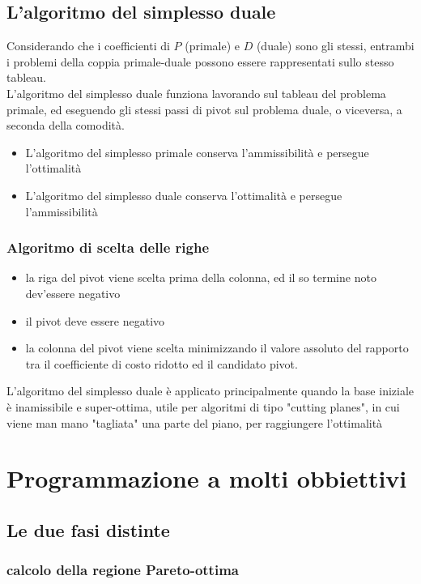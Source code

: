 \documentclass[11pt, oneside]{article}   	%
\begin{document}
\subsection{L'algoritmo del simplesso duale}
Considerando che i coefficienti di $P$ (primale) e $D$ (duale) sono gli stessi, entrambi i problemi della coppia primale-duale possono essere rappresentati sullo stesso tableau.\\

L'algoritmo del simplesso duale funziona lavorando sul tableau del problema primale, ed eseguendo gli stessi passi di pivot sul problema duale, o viceversa, a seconda della comodità.
\begin{itemize}
\item L'algoritmo del simplesso primale conserva l'ammissibilità e persegue l'ottimalità
\item L'algoritmo del simplesso duale conserva l'ottimalità e persegue l'ammissibilità
\end{itemize}
\subsubsection{Algoritmo di scelta delle righe}
\begin{itemize}
\item la riga del pivot viene scelta prima della colonna, ed il so termine noto dev'essere negativo
\item il pivot deve essere negativo
\item la colonna del pivot viene scelta minimizzando il valore assoluto del rapporto tra il coefficiente di costo ridotto ed il candidato pivot.
\end{itemize}
L'algoritmo del simplesso duale è applicato principalmente quando la base iniziale è inamissibile e super-ottima, utile per algoritmi di tipo "cutting planes", in cui viene man mano "tagliata" una parte del piano, per raggiungere l'ottimalità


\section{Programmazione a molti obbiettivi}
\subsection{Le due fasi distinte}
\subsubsection{calcolo della regione Pareto-ottima}
\end{document}
